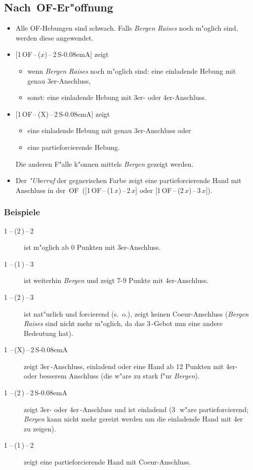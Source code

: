 \documentclass[11pt,german,twocolumn]{scrartcl}
\renewcommand{\Cl}{{\color{ClColor}{\clubs}}}
\renewcommand{\Di}{{\color{DiColor}{\sdiamonds}}}
\renewcommand{\He}{{\color{HeColor}{\shearts}}}
\renewcommand{\Sp}{{\color{SpColor}{\spades}}}
\def\pik{\,\Sp}
\def\coe{\,\He}
\def\kar{\,\Di}
\def\tre{\,\Cl}
\def\of{\textsf{\,OF}}
\def\ofa{\textsf{OF}}
\def\sa{\textsf{S\kern-0.08emA}}
\def\SA{\,\sa}
\def\kontra{\textsf{X}}
\def\sep{\,--\,}
\newcommand{\conv}[1]{\emph{#1}}
\begin{document}
\subsection{Nach \of-Er"offnung}
\begin{itemize}
\item Alle \ofa-Hebungen sind schwach.  Falls \conv{Bergen Raises}
  noch m"oglich sind, werden diese angewendet.
\item {[}1\of\sep($x$)\sep2\SA{]} zeigt
  \begin{itemize}
  \item wenn \conv{Bergen Raises} noch m"oglich sind: eine einladende
    Hebung mit genau 3er-Anschluss,
  \item sonst: eine einladende Hebung mit 3er- oder 4er-Anschluss.
  \end{itemize}
\item {[}1\of\sep(\kontra)\sep2\SA{]} zeigt
  \begin{itemize}
    \item eine einladende Hebung mit genau 3er-Anschluss oder
    \item eine partieforcierende Hebung.
  \end{itemize}
Die anderen F"alle k"onnen mittels \conv{Bergen} gezeigt werden.
\item Der \conv{"Uberruf} der gegnerischen Farbe zeigt eine
  partieforcierende Hand mit Anschluss in der \of\
  ([1\of\sep(1\,$x$)\sep2\,$x$] oder [1\of\sep(2\,$x$)\sep3\,$x$]).
\end{itemize}

\subsubsection{Beispiele}
\begin{description}
\item[1\pik\sep(2\kar)\sep2\pik] ist m"oglich ab 0 Punkten mit
  3er-Anschluss.
\item[1\coe\sep(1\pik)\sep3\kar] ist weiterhin \conv{Bergen} und zeigt
  7-9 Punkte mit 4er-Anschluss.
\item[1\coe\sep(2\tre)\sep3\kar] ist nat"urlich und forcierend
  (s.~o.), zeigt keinen Coeur-Anschluss (\conv{Bergen Raises} sind
  nicht mehr m"oglich, da das 3\tre-Gebot nun eine andere Bedeutung
  hat).
\item[1\pik\sep(X)\sep2\SA] zeigt 3er\pik-Anschluss, einladend oder
  eine Hand ab 12 Punkten mit 4er- oder besserem Anschluss (die w"are
  zu stark f"ur \conv{Bergen}).
\item[1\pik\sep(2\kar)\sep2\SA] zeigt 3er- oder 4er\pik-Anschluss und
  ist einladend (3\kar\ w"are partieforcierend; \conv{Bergen} kann
  nicht mehr gereizt werden um die einladende Hand mit 4er\pik{}
  zu zeigen).
\item[1\coe\sep(1\pik)\sep2\pik] zeigt eine partieforcierende Hand mit
  Coeur-Anschluss.
\end{description}
\end{document}
